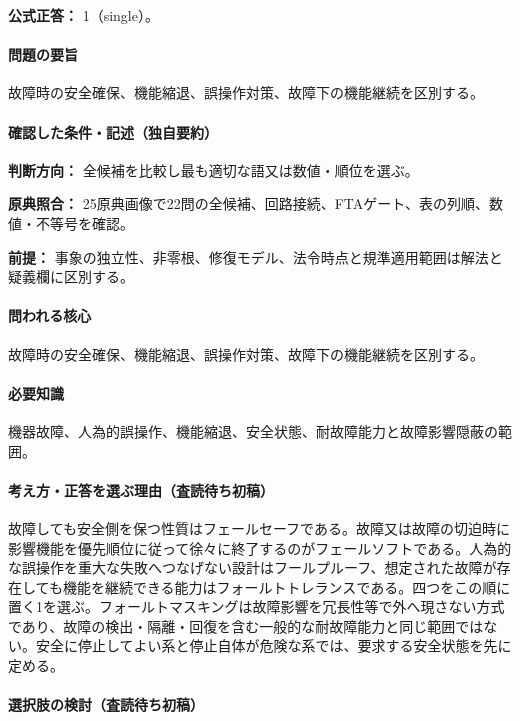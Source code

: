 \textbf{公式正答：} 1（single）。

\paragraph{問題の要旨} 故障時の安全確保、機能縮退、誤操作対策、故障下の機能継続を区別する。

\paragraph{確認した条件・記述（独自要約）}\mbox{}\par

\noindent\textbf{判断方向：} 全候補を比較し最も適切な語又は数値・順位を選ぶ。\par

\noindent\textbf{原典照合：} 25原典画像で22問の全候補、回路接続、FTAゲート、表の列順、数値・不等号を確認。\par

\noindent\textbf{前提：} 事象の独立性、非零根、修復モデル、法令時点と規準適用範囲は解法と疑義欄に区別する。\par

\paragraph{問われる核心} 故障時の安全確保、機能縮退、誤操作対策、故障下の機能継続を区別する。

\paragraph{必要知識} 機器故障、人為的誤操作、機能縮退、安全状態、耐故障能力と故障影響隠蔽の範囲。

\paragraph{考え方・正答を選ぶ理由（査読待ち初稿）} 故障しても安全側を保つ性質はフェールセーフである。故障又は故障の切迫時に影響機能を優先順位に従って徐々に終了するのがフェールソフトである。人為的な誤操作を重大な失敗へつなげない設計はフールプルーフ、想定された故障が存在しても機能を継続できる能力はフォールトトレランスである。四つをこの順に置く1を選ぶ。フォールトマスキングは故障影響を冗長性等で外へ現さない方式であり、故障の検出・隔離・回復を含む一般的な耐故障能力と同じ範囲ではない。安全に停止してよい系と停止自体が危険な系では、要求する安全状態を先に定める。

\paragraph{選択肢の検討（査読待ち初稿）}\mbox{}\par

